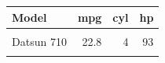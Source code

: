 \begin{table}[!h]
\centering
\begin{tabular}{lrrr}
\toprule
Model & mpg & cyl & hp\\
\midrule
\cellcolor{gray!10}{Mazda RX4} & \cellcolor{gray!10}{21.0} & \cellcolor{gray!10}{6} & \cellcolor{gray!10}{110}\\
Datsun 710 & 22.8 & 4 & 93\\
\cellcolor{gray!10}{Hornet 4} & \cellcolor{gray!10}{21.4} & \cellcolor{gray!10}{6} & \cellcolor{gray!10}{110}\\
\bottomrule
\end{tabular}
\end{table}
